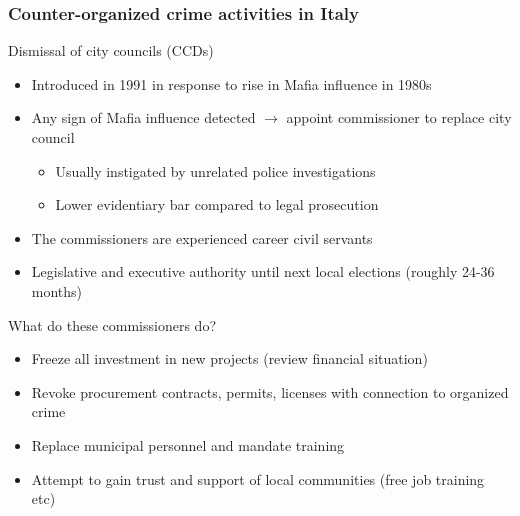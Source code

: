 \documentclass[aspectratio=169]{beamer}
\begin{document}
\begin{frame}
\frametitle{Counter-organized crime activities in Italy} 
Dismissal of city councils (CCDs)
\begin{itemize}\setlength\itemsep{3pt}
\item Introduced in 1991 in response to rise in Mafia influence in 1980s
\item Any sign of Mafia influence detected $\to$ appoint commissioner to replace city council
\begin{itemize}\setlength\itemsep{3pt}
\item Usually instigated by unrelated police investigations 
\item Lower evidentiary bar compared to legal prosecution
\end{itemize}
\item The commissioners are experienced career civil servants
\item Legislative and executive authority until next local elections (roughly 24-36 months)
\end{itemize} \medskip
 What do these commissioners do?
\begin{itemize}\setlength\itemsep{3pt}
\item Freeze all investment in new projects (review financial situation)
\item Revoke procurement contracts, permits, licenses with connection to organized crime
\item Replace municipal personnel and mandate training 
\item Attempt to gain trust and support of local communities (free job training etc)
\end{itemize}
\end{frame}
\end{document}
